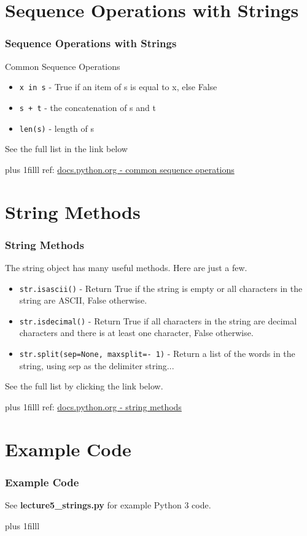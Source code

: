 \documentclass[fleqn]{beamer} %
\newcommand{\sectiontitleIII}{Sequence Operations with Strings}
\newcommand{\sectiontitleIV}{String Methods}
\newcommand{\sectiontitleV}{Example Code}
\newcommand{\btVFill}{\vskip0pt plus 1filll}
\begin{document}
\section{\sectiontitleIII}

	\begin{frame}[label=sectionIII, containsverbatim] \small
		\frametitle{\sectiontitleIII}

		Common Sequence Operations

		\begin{itemize}
		\item \lstinline{x in s} - True if an item of s is equal to x, else False 	
		\item \lstinline{s + t} - the concatenation of s and t
		\item \lstinline{len(s)} - length of s 
		\end{itemize}
		
		See the full list in the link below

		\btVFill
		\tiny{ref: \href{https://docs.python.org/3/library/stdtypes.html#common-sequence-operations}{docs.python.org - common sequence operations}}
	\end{frame}

\section{\sectiontitleIV}	
	\begin{frame}[label=sectionIV] \small
		\frametitle{\sectiontitleIV}

		The string object has many useful methods. Here are just a few. \vspace{3mm}

		\begin{itemize}
			\item \lstinline{str.isascii()} - Return True if the string is empty or all characters in the string are ASCII, False otherwise.
			\item \lstinline{str.isdecimal()} - Return True if all characters in the string are decimal characters and there is at least one character, False otherwise.
			\item \lstinline{str.split(sep=None, maxsplit=- 1)} - Return a list of the words in the string, using sep as the delimiter string...
		\end{itemize}
		\vspace*{5mm}

		See the full list by clicking the link below. 

		\btVFill
		\tiny{ref: \href{https://docs.python.org/3/library/stdtypes.html\#string-methods}{docs.python.org - string methods} } 
	\end{frame}

\section{\sectiontitleV}	
 	\begin{frame}[label=sectionV,containsverbatim] \small
 	 	\frametitle{\sectiontitleV}    
 	 	
 	 	\vspace*{15mm}
		See {\bf lecture5\_strings.py} for example Python 3 code.	

 	 	\btVFill
 		\tiny{}
 	\end{frame}
\end{document}
